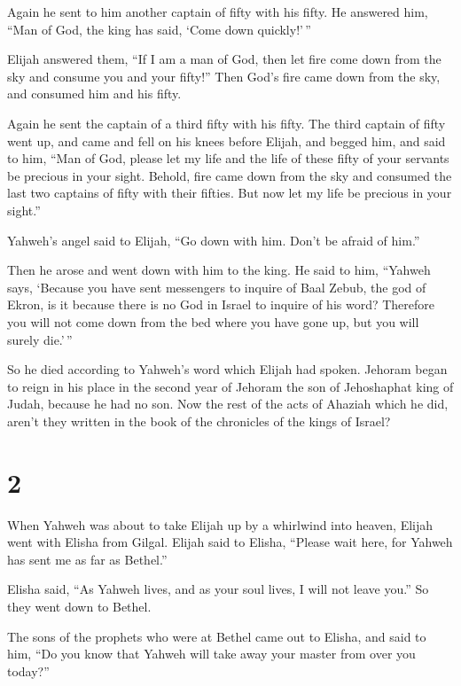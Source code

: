  Again he sent to him another captain of fifty with his
fifty. He answered him, ``Man of God, the king has said, `Come down
quickly!'\,''

 Elijah answered them, ``If I am a man of God, then let
fire come down from the sky and consume you and your fifty!'' Then God's
fire came down from the sky, and consumed him and his fifty.

 Again he sent the captain of a third fifty with his
fifty. The third captain of fifty went up, and came and fell on his
knees before Elijah, and begged him, and said to him, ``Man of God,
please let my life and the life of these fifty of your servants be
precious in your sight.  Behold, fire came down from the
sky and consumed the last two captains of fifty with their fifties. But
now let my life be precious in your sight.''

 Yahweh's angel said to Elijah, ``Go down with him. Don't
be afraid of him.''

Then he arose and went down with him to the king.  He
said to him, ``Yahweh says, `Because you have sent messengers to inquire
of Baal Zebub, the god of Ekron, is it because there is no God in Israel
to inquire of his word? Therefore you will not come down from the bed
where you have gone up, but you will surely die.'\,''

 So he died according to Yahweh's word which Elijah had
spoken. Jehoram began to reign in his place in the second year of
Jehoram the son of Jehoshaphat king of Judah, because he had no son.
 Now the rest of the acts of Ahaziah which he did, aren't
they written in the book of the chronicles of the kings of Israel?

\hypertarget{section-1}{%
\section{2}\label{section-1}}

 When Yahweh was about to take Elijah up by a whirlwind
into heaven, Elijah went with Elisha from Gilgal.  Elijah
said to Elisha, ``Please wait here, for Yahweh has sent me as far as
Bethel.''

Elisha said, ``As Yahweh lives, and as your soul lives, I will not leave
you.'' So they went down to Bethel.

 The sons of the prophets who were at Bethel came out to
Elisha, and said to him, ``Do you know that Yahweh will take away your
master from over you today?''

